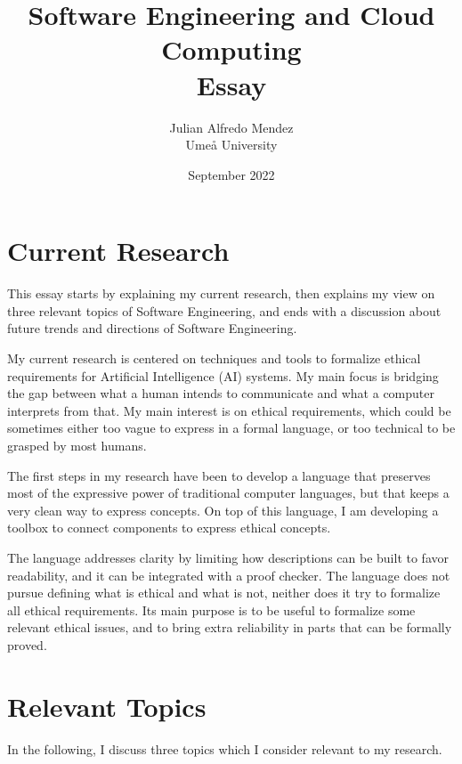 \documentclass[11pt]{article}
\begin{document}
    \title{Software Engineering and Cloud Computing \\
    Essay
    }
    \author{Julian Alfredo Mendez \\
    Ume{\aa} University}

    \date{September 2022}

    \maketitle


    \section{Current Research}

    This essay starts by explaining my current research, then explains my view on three relevant topics of Software Engineering, and ends with a discussion about future trends and directions of Software Engineering.

    My current research is centered on techniques and tools to formalize ethical requirements for Artificial Intelligence (AI) systems.
    My main focus is bridging the gap between what a human intends to communicate and what a computer interprets from that.
    My main interest is on ethical requirements, which could be sometimes either too vague to express in a formal language, or too technical to be grasped by most humans.

    The first steps in my research have been to develop a language that preserves most of the expressive power of traditional computer languages, but that keeps a very clean way to express concepts.
    On top of this language, I am developing a toolbox to connect components to express ethical concepts.

    The language addresses clarity by limiting how descriptions can be built to favor readability, and it can be integrated with a proof checker.
    The language does not pursue defining what is ethical and what is not, neither does it try to formalize all ethical requirements.
    Its main purpose is to be useful to formalize some relevant ethical issues, and to bring extra reliability in parts that can be formally proved.


    \section{Relevant Topics}

    In the following, I discuss three topics which I consider relevant to my research.
\end{document}
